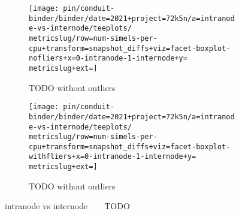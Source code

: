 \begin{figure*}
  \centering
  \begin{subfigure}[b]{0.5\textwidth}
    \centering
    \texttt{[image: pin/conduit-binder/binder/date=2021+project=72k5n/a=intranode-vs-internode/teeplots/\\metricslug/row=num-simels-per-cpu+transform=snapshot\_diffs+viz=facet-boxplot-nofliers+x=0-intranode-1-internode+y=\\metricslug+ext=]}
    \caption{TODO without outliers}
    \label{fig:intranode-vs-internode-distribution-\metricslug-nofliers}
  \end{subfigure}%
  \begin{subfigure}[b]{0.5\textwidth}
    \centering
    \texttt{[image: pin/conduit-binder/binder/date=2021+project=72k5n/a=intranode-vs-internode/teeplots/\\metricslug/row=num-simels-per-cpu+transform=snapshot\_diffs+viz=facet-boxplot-withfliers+x=0-intranode-1-internode+y=\\metricslug+ext=]}
    \caption{TODO without outliers}
    \label{fig:intranode-vs-internode-distribution-\metricslug-withfliers}
  \end{subfigure}
  \caption{intranode vs internode ~ \metric ~ TODO}
  \label{fig:intranode-vs-internode-distribution-\metricslug}
\end{figure*}
